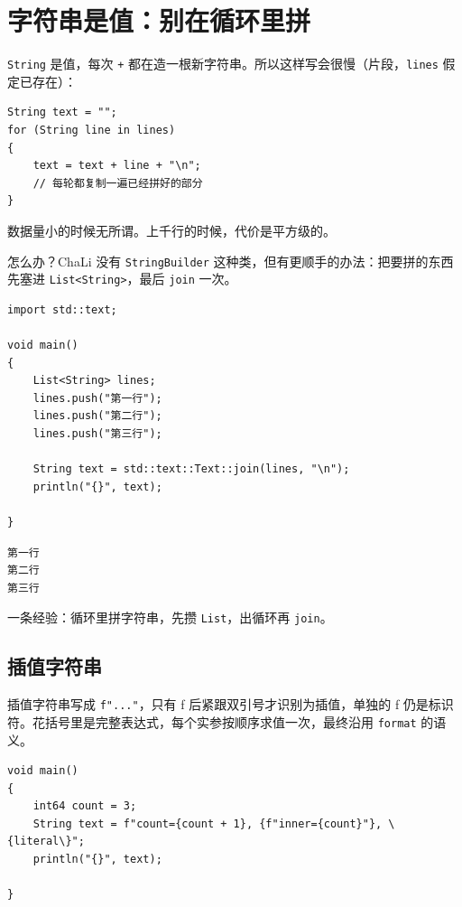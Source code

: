 \section{字符串是值：别在循环里拼}

\texttt{String} 是值，每次 \texttt{+} 都在造一根新字符串。所以这样写会很慢（片段，\texttt{lines} 假定已存在）：

\par
\medskip
\begin{lstlisting}[style=chali]
String text = "";
for (String line in lines)
{
    text = text + line + "\n";
    // 每轮都复制一遍已经拼好的部分
}
\end{lstlisting}
\par
\medskip

数据量小的时候无所谓。上千行的时候，代价是平方级的。

怎么办？ChaLi 没有 \texttt{String\allowbreak{}Builder} 这种类，但有更顺手的办法：把要拼的东西先塞进 \texttt{List<\allowbreak{}String>\allowbreak{}}，最后 \texttt{join} 一次。

\par
\medskip
\begin{lstlisting}[style=chali]
import std::text;

void main()
{
    List<String> lines;
    lines.push("第一行");
    lines.push("第二行");
    lines.push("第三行");

    String text = std::text::Text::join(lines, "\n");
    println("{}", text);

}
\end{lstlisting}
\par
\medskip

\par
\medskip
\begin{lstlisting}[style=out]
第一行
第二行
第三行
\end{lstlisting}
\par
\medskip

一条经验：循环里拼字符串，先攒 \texttt{List}，出循环再 \texttt{join}。

\subsection*{插值字符串}

插值字符串写成 \texttt{f".\allowbreak{}.\allowbreak{}.\allowbreak{}"}，只有 f 后紧跟双引号才识别为插值，单独的 f 仍是标识符。花括号里是完整表达式，每个实参按顺序求值一次，最终沿用 \texttt{format} 的语义。

\par
\medskip
\begin{lstlisting}[style=chali]
void main()
{
    int64 count = 3;
    String text = f"count={count + 1}, {f"inner={count}"}, \{literal\}";
    println("{}", text);

}
\end{lstlisting}
\par
\medskip

